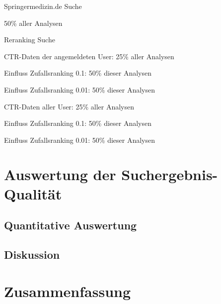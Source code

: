 \centering
\begin{myitemize}
\setlength\itemsep{0em}
\item Springermedizin.de Suche 
\begin{myitemize}
\item 50\% aller Analysen
\end{myitemize}
\item Reranking Suche 
\begin{myitemize}
\item CTR-Daten der angemeldeten User: 25\% aller Analysen
\begin{myitemize}
\item Einfluss Zufallsranking 0.1: 50\% dieser Analysen 
\item Einfluss Zufallsranking 0.01: 50\% dieser Analysen 
\end{myitemize}
\item CTR-Daten aller User: 25\% aller Analysen
\begin{myitemize}
\item Einfluss Zufallsranking 0.1: 50\% dieser Analysen 
\item Einfluss Zufallsranking 0.01: 50\% dieser Analysen 
\end{myitemize}
\end{myitemize}
\end{myitemize}

\section{Auswertung der Suchergebnis-Qualität}
\label{sec:Evaluation:Auswertung}

\subsection{Quantitative Auswertung}
\label{sec:Evaluation:Auswertung:QuantitativeAuswertung}

\subsection{Diskussion}
\label{sec:Evaluation:Auswertung:Diskussion}

\section{Zusammenfassung}
\label{sec:Evaluation:Zusammenfassung}


